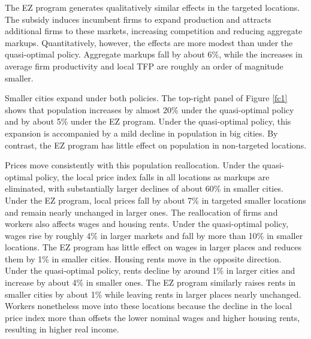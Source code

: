 The EZ program generates qualitatively similar effects in the targeted locations. The subsidy induces incumbent firms to expand production and attracts additional firms to these markets, increasing competition and reducing aggregate markups. Quantitatively, however, the effects are more modest than under the quasi-optimal policy. Aggregate markups fall by about 6\%, while the increases in average firm productivity and local TFP are roughly an order of magnitude smaller.

Smaller cities expand under both policies. The top-right panel of Figure \ref{fc1} shows that population increases by almost 20\% under the quasi-optimal policy and by about 5\% under the EZ program. Under the quasi-optimal policy, this expansion is accompanied by a mild decline in population in big cities. By contrast, the EZ program has little effect on population in non-targeted locations.

Prices move consistently with this population reallocation. Under the quasi-optimal policy, the local price index falls in all locations as markups are eliminated, with substantially larger declines of about 60\% in smaller cities. Under the EZ program, local prices fall by about 7\% in targeted smaller locations and remain nearly unchanged in larger ones. The reallocation of firms and workers also affects wages and housing rents. Under the quasi-optimal policy, wages rise by roughly 4\% in larger markets and fall by more than 10\% in smaller locations. The EZ program has little effect on wages in larger places and reduces them by 1\% in smaller cities. Housing rents move in the opposite direction. Under the quasi-optimal policy, rents decline by around 1\% in larger cities and increase by about 4\% in smaller ones. The EZ program similarly raises rents in smaller cities by about 1\% while leaving rents in larger places nearly unchanged. Workers nonetheless move into these locations because the decline in the local price index more than offsets the lower nominal wages and higher housing rents, resulting in higher real income.

